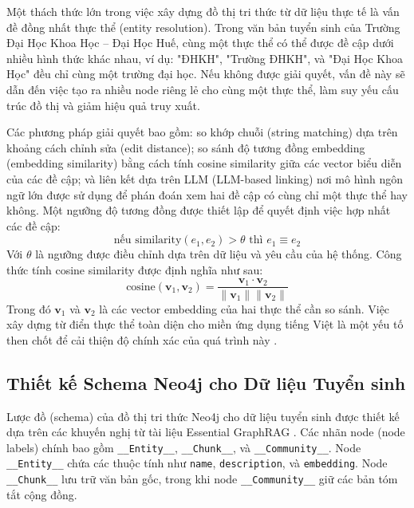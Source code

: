 Một thách thức lớn trong việc xây dựng đồ thị tri thức từ dữ liệu thực tế là vấn đề đồng nhất thực thể (entity resolution). Trong văn bản tuyển sinh của Trường Đại Học Khoa Học – Đại Học Huế, cùng một thực thể có thể được đề cập dưới nhiều hình thức khác nhau, ví dụ: "ĐHKH", "Trường ĐHKH", và "Đại Học Khoa Học" đều chỉ cùng một trường đại học. Nếu không được giải quyết, vấn đề này sẽ dẫn đến việc tạo ra nhiều node riêng lẻ cho cùng một thực thể, làm suy yếu cấu trúc đồ thị và giảm hiệu quả truy xuất.

Các phương pháp giải quyết bao gồm: so khớp chuỗi (string matching) dựa trên khoảng cách chỉnh sửa (edit distance); so sánh độ tương đồng embedding (embedding similarity) bằng cách tính cosine similarity giữa các vector biểu diễn của các đề cập; và liên kết dựa trên LLM (LLM-based linking) nơi mô hình ngôn ngữ lớn được sử dụng để phán đoán xem hai đề cập có cùng chỉ một thực thể hay không. Một ngưỡng độ tương đồng được thiết lập để quyết định việc hợp nhất các đề cập:
\begin{equation}
\text{nếu } \text{similarity}(e_1, e_2) > \theta \text{ thì } e_1 \equiv e_2
\label{eq:entity_resolution}
\end{equation}
Với $\theta$ là ngưỡng được điều chỉnh dựa trên dữ liệu và yêu cầu của hệ thống. Công thức tính cosine similarity được định nghĩa như sau:
\begin{equation}
\text{cosine}(\mathbf{v}_1, \mathbf{v}_2) = \frac{\mathbf{v}_1 \cdot \mathbf{v}_2}{\|\mathbf{v}_1\| \|\mathbf{v}_2\|}
\label{eq:cosine_similarity}
\end{equation}
Trong đó $\mathbf{v}_1$ và $\mathbf{v}_2$ là các vector embedding của hai thực thể cần so sánh. Việc xây dựng từ điển thực thể toàn diện cho miền ứng dụng tiếng Việt là một yếu tố then chốt để cải thiện độ chính xác của quá trình này \cite{tran2024vietnamese}.

\subsection{Thiết kế Schema Neo4j cho Dữ liệu Tuyển sinh}
\label{subsec:neo4j_schema}

Lược đồ (schema) của đồ thị tri thức Neo4j cho dữ liệu tuyển sinh được thiết kế dựa trên các khuyến nghị từ tài liệu Essential GraphRAG \cite{neo4j2024essential}. Các nhãn node (node labels) chính bao gồm \texttt{__Entity__}, \texttt{__Chunk__}, và \texttt{__Community__}. Node \texttt{__Entity__} chứa các thuộc tính như \texttt{name}, \texttt{description}, và \texttt{embedding}. Node \texttt{__Chunk__} lưu trữ văn bản gốc, trong khi node \texttt{__Community__} giữ các bản tóm tắt cộng đồng.


